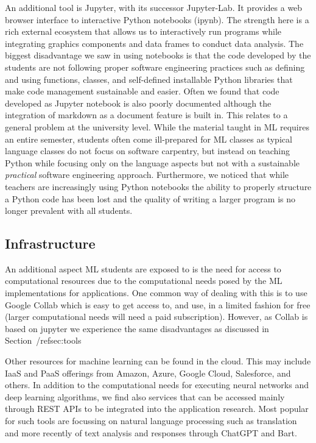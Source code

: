 \documentclass[utf8]{FrontiersinVancouver} %
\begin{document}
An additional tool is Jupyter, with its successor Jupyter-Lab. It
provides a web browser interface to interactive Python notebooks
(ipynb). The strength here is a rich external ecosystem that allows us
to interactively run programs while integrating graphics components
and data frames to conduct data analysis.  The biggest disadvantage we
saw in using notebooks is that the code developed by the students are
not following proper software engineering practices such as defining
and using functions, classes, and self-defined installable Python
libraries that make code management sustainable and easier. Often we
found that code developed as Jupyter notebook is also poorly
documented although the integration of markdown as a document feature
is built in. This relates to a general problem at the university
level. While the material taught in ML requires an entire semester,
students often come ill-prepared for ML classes as typical language
classes do not focus on software carpentry, but instead on teaching
Python while focusing only on the language aspects but not with a
sustainable {\em practical} software engineering
approach. Furthermore, we noticed that while teachers are increasingly
using Python notebooks the ability to properly structure a Python code
has been lost and the quality of writing a larger program is no longer
prevalent with all students.


\subsection{Infrastructure}

An additional aspect ML students are exposed to is the need for access
to computational resources due to the computational needs posed by the
ML implementations for applications. One common way of dealing with
this is to use Google Collab which is easy to get access to, and use,
in a limited fashion for free (larger computational needs will need a
paid subscription).  However, as Collab is based on jupyter we
experience the same disadvantages as discussed in
Section~/ref{sec:tools}

Other resources for machine learning can be found in the cloud. This
may include IaaS and PaaS offerings from Amazon, Azure, Google Cloud,
Salesforce, and others.  In addition to the computational needs for
executing neural networks and deep learning algorithms, we find also
services that can be accessed mainly through REST APIs to be
integrated into the application research. Most popular for such tools
are focussing on natural language processing such as translation and
more recently of text analysis and responses through ChatGPT and Bart.
\end{document}
